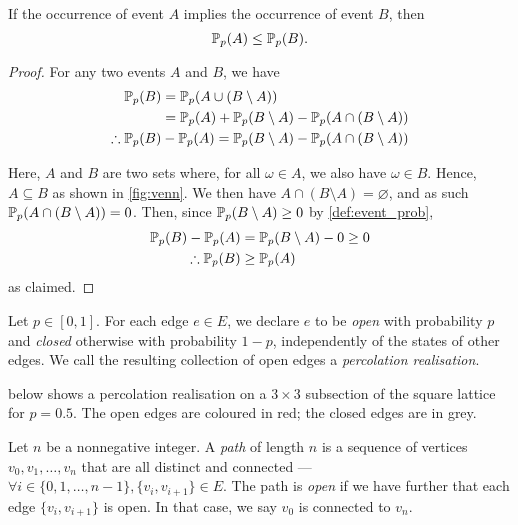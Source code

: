 \documentclass[a4paper, 12pt]{article}
\begin{document}
\begin{lem}[Monotonicity]\label{lem:event_subseteq}
If the occurrence of event $A$ implies the occurrence of event $B$, then $$\mathbb{P}_p(A) \leq \mathbb{P}_p(B).$$
\end{lem}
\begin{proof}
For any two events $A$ and $B$, we have
\begin{align*}
    \mathbb{P}_p(B) 
    &= \mathbb{P}_p(A \cup (B \setminus A))\\
    &= \mathbb{P}_p(A) + \mathbb{P}_p(B \setminus A) - \mathbb{P}_p(A \cap (B \setminus A))\\
    \therefore \mathbb{P}_p(B) &- \mathbb{P}_p(A) = \mathbb{P}_p(B \setminus A) - \mathbb{P}_p(A \cap (B \setminus A))
\end{align*}


Here, $A$ and $B$ are two sets where, for all $\omega \in A$, we also have $\omega \in B$. Hence, $A \subseteq B$ as shown in \cref{fig:venn}. We then have $A \cap (B \setminus A) = \varnothing$, and as such $\mathbb{P}_p(A \cap (B \setminus A)) = 0$. Then, since $\mathbb{P}_p(B \setminus A) \geq 0$ by \cref{def:event_prob}, 
\begin{align*}
\mathbb{P}_p(B) - \mathbb{P}_p(A) &= \mathbb{P}_p(B \setminus A) - 0 \geq 0\\
\therefore \mathbb{P}_p(B) &\geq \mathbb{P}_p(A)
\end{align*}
as claimed.
\end{proof}

\begin{defn}
    Let $p \in [0, 1]$. For each edge $e \in E$, we declare $e$ to be \textit{open} with probability $p$ and \textit{closed} otherwise with probability $1 - p$, independently of the states of other edges. We call the resulting collection of open edges a \textit{percolation realisation}.
\end{defn}
\begin{ex*}
     below shows a percolation realisation on a $3 \times 3$ subsection of the square lattice for $p = 0.5$. The open edges are coloured in red; the closed edges are in grey.
\end{ex*}

\begin{defn}\label{def:path}
    Let $n$ be a nonnegative integer. A \textit{path} of length $n$ is a sequence of vertices $v_0, v_1, \dots, v_{n}$ that are all distinct and connected --- $\forall i \in \{0, 1, \dots, n - 1\}, \{v_i ,v_{i + 1}\} \in E$. The path is \textit{open} if we have further that each edge $\{v_i, v_{i + 1}\}$ is open. In that case, we say $v_0$ is connected to $v_{n}$.
\end{defn}
\begin{ex*}\end{ex*}

\end{document}
